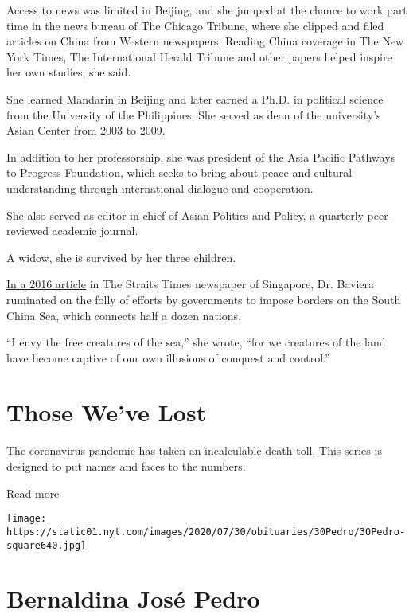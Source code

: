 Access to news was limited in Beijing, and she jumped at the chance to
work part time in the news bureau of The Chicago Tribune, where she
clipped and filed articles on China from Western newspapers. Reading
China coverage in The New York Times, The International Herald Tribune
and other papers helped inspire her own studies, she said.

She learned Mandarin in Beijing and later earned a Ph.D. in political
science from the University of the Philippines. She served as dean of
the university's Asian Center from 2003 to 2009.

In addition to her professorship, she was president of the Asia Pacific
Pathways to Progress Foundation, which seeks to bring about peace and
cultural understanding through international dialogue and cooperation.

She also served as editor in chief of Asian Politics and Policy, a
quarterly peer-reviewed academic journal.

A widow, she is survived by her three children.

\href{https://www.straitstimes.com/asia/can-anyone-really-rule-the-south-china-sea}{In
a 2016 article} in The Straits Times newspaper of Singapore, Dr. Baviera
ruminated on the folly of efforts by governments to impose borders on
the South China Sea, which connects half a dozen nations.

``I envy the free creatures of the sea,'' she wrote, ``for we creatures
of the land have become captive of our own illusions of conquest and
control.''

\href{https://www.nytimes.com/interactive/2020/obituaries/people-died-coronavirus-obituaries.html?action=click\&pgtype=Article\&state=default\&region=BELOW_MAIN_CONTENT\&context=covid_obits_promo}{}

\hypertarget{those-weve-lost}{%
\section{Those We've Lost}\label{those-weve-lost}}

The coronavirus pandemic has taken an incalculable death toll. This
series is designed to put names and faces to the numbers.

Read more

\texttt{[image: https://static01.nyt.com/images/2020/07/30/obituaries/30Pedro/30Pedro-square640.jpg]}

\hypertarget{bernaldina-josuxe9-pedro}{%
\section{Bernaldina José Pedro}\label{bernaldina-josuxe9-pedro}}

